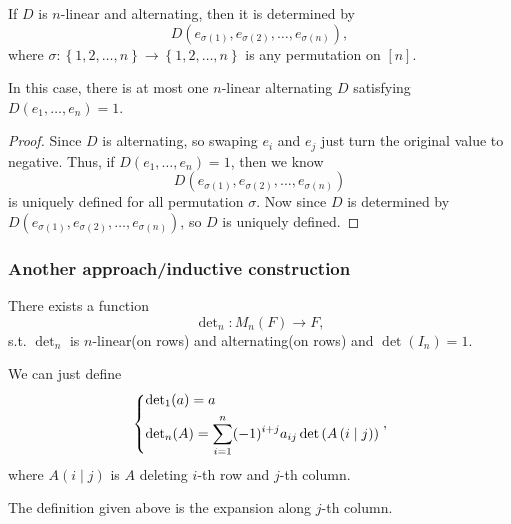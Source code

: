 \begin{proposition}
    If \(D\) is \(n\)-linear and alternating, then it is determined by 
    \[
        D \left( e_{\sigma (1)}, e_{\sigma (2)}, \dots , e_{\sigma (n)} \right), 
    \] where \(\sigma : \left\{ 1, 2, \dots , n \right\} \to \left\{ 1, 2, \dots , n \right\}  \) is any permutation on \([n]\). 
\end{proposition}

\begin{remark}
    In this case, there is at most one \(n\)-linear alternating \(D\) satisfying \(D(e_1, \dots , e_n) = 1\).   
\end{remark}
\begin{proof}
    Since \(D\) is alternating, so swaping \(e_i\) and \(e_j\) just turn the original value to negative. Thus, if \(D(e_1, \dots , e_n) = 1\), then we know 
    \[
        D \left( e_{\sigma (1)}, e_{\sigma (2)}, \dots , e_{\sigma (n)} \right) 
    \] is uniquely defined for all permutation \(\sigma \). Now since \(D\) is determined by \(D \left( e_{\sigma (1)}, e_{\sigma (2)}, \dots , e_{\sigma (n)} \right) \), so \(D\) is uniquely defined.   
\end{proof}

\subsubsection{Another approach/inductive construction}
\begin{theorem}
    There exists a function
    \[
        \mathrm{\det }  _n: M_n(F) \to F,
    \]s.t. \(\det_n \) is \(n\)-linear(on rows) and alternating(on rows) and \(\det \left( I_n \right) = 1 \).   
\end{theorem}
We can just define 
\[
    \begin{dcases}
        \mathrm{\det }  _1 (a) = a \\
        \mathrm{\det }  _n(A) = \sum_{i=1}^n(-1)^{i+j} a_{ij} \det \left( A \left( i \mid j \right)  \right)   
    \end{dcases}, 
\]where \(A(i \mid j)\) is \(A\) deleting \(i\)-th row and \(j\)-th column. 
\begin{note}
    The definition given above is the expansion along \(j\)-th column. 
\end{note}   